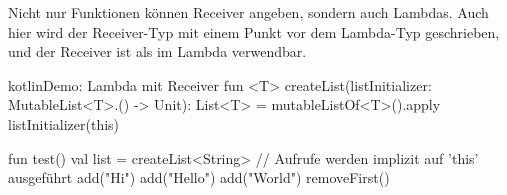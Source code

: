Nicht nur Funktionen können Receiver angeben, sondern auch Lambdas.
Auch hier wird der Receiver-Typ mit einem Punkt vor dem Lambda-Typ geschrieben, und der Receiver ist als
 im Lambda verwendbar.\cite{kdocLambdas}

\begin{codeBlock}{kotlin}{Demo: Lambda mit Receiver}
fun <T> createList(listInitializer: MutableList<T>.() -> Unit): List<T> =
    mutableListOf<T>().apply { listInitializer(this) }

fun test() {
    val list = createList<String> {
        // Aufrufe werden implizit auf 'this' ausgeführt
        add("Hi")
        add("Hello")
        add("World")
        removeFirst()
    }
}
\end{codeBlock}

\renewcommand{\kapitelautor}{}
